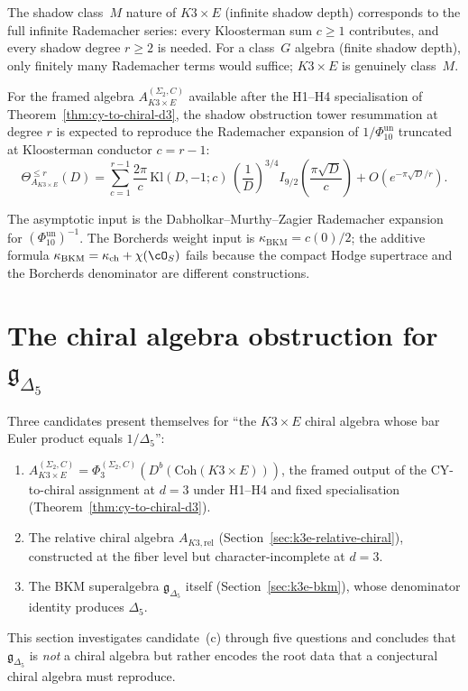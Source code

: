 \noindent The shadow class~$M$ nature of $K3 \times E$ (infinite shadow depth) corresponds to the full infinite Rademacher series: every Kloosterman sum $c \geq 1$ contributes, and every shadow degree $r \geq 2$ is needed. For a class~$G$ algebra (finite shadow depth), only finitely many Rademacher terms would suffice; $K3 \times E$ is genuinely class~$M$.

\begin{conjecture}
\label{conj:k3e-shadow-rademacher}
For the framed algebra $A_{K3 \times E}^{(\Sigma_2,C)}$ available after the H1--H4 specialisation of Theorem~\ref{thm:cy-to-chiral-d3}, the shadow obstruction tower resummation at degree $r$ is expected to reproduce the Rademacher expansion of \(1/\Phi_{10}^{\mathrm{un}}\) truncated at Kloosterman conductor $c = r - 1$:
\[
 \Theta^{\leq r}_{A_{K3 \times E}}(D)
 = \sum_{c=1}^{r-1} \frac{2\pi}{c}\,\mathrm{Kl}(D, -1; c)\, \left(\frac{1}{D}\right)^{3/4} I_{9/2}\!\left(\frac{\pi\sqrt{D}}{c}\right)
 + O(e^{-\pi\sqrt{D}/r}).
\]
\end{conjecture}

The asymptotic input is the Dabholkar--Murthy--Zagier Rademacher
expansion for \((\Phi_{10}^{\mathrm{un}})^{-1}\). The Borcherds weight
input is \(\kappa_{\mathrm{BKM}}=c(0)/2\); the additive formula
\(\kappa_{\mathrm{BKM}}=\kappa_{\mathrm{ch}}+\chi(\cO_S)\) fails because
the compact Hodge supertrace and the Borcherds denominator are
different constructions.


\section{The chiral algebra obstruction for \texorpdfstring{$\mathfrak{g}_{\Delta_5}$}{g-Delta-5}}
\label{sec:k3e-bkm-chiral-obstruction}

Three candidates present themselves for ``the $K3 \times E$ chiral algebra whose bar Euler product equals $1/\Delta_5$'':
\begin{enumerate}[label=(\alph*)]
\item $A_{K3 \times E}^{(\Sigma_2,C)} = \Phi_3^{(\Sigma_2,C)}(D^b(\mathrm{Coh}(K3 \times E)))$, the framed output of the CY-to-chiral assignment at $d = 3$ under H1--H4 and fixed specialisation (Theorem~\ref{thm:cy-to-chiral-d3}).
\item The relative chiral algebra $A_{K3,\mathrm{rel}}$ (Section~\ref{sec:k3e-relative-chiral}), constructed at the fiber level but character-incomplete at $d = 3$.
\item The BKM superalgebra $\mathfrak{g}_{\Delta_5}$ itself (Section~\ref{sec:k3e-bkm}), whose denominator identity produces $\Delta_5$.
\end{enumerate}
This section investigates candidate~(c) through five questions and concludes that $\mathfrak{g}_{\Delta_5}$ is \emph{not} a chiral algebra but rather encodes the root data that a conjectural chiral algebra must reproduce.


